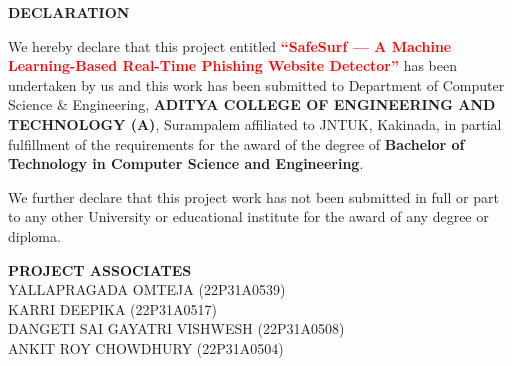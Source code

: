 \begin{center}
{\bfseries\fontsize{16}{18}\selectfont DECLARATION}
\end{center}

\vspace{0.5cm}
\noindent
We hereby declare that this project entitled
\textbf{\textcolor{red}{``SafeSurf — A Machine Learning-Based Real-Time Phishing Website Detector''}}
has been undertaken by us and this work has been submitted to Department of Computer Science \& Engineering,
\textbf{ADITYA \newline COLLEGE OF ENGINEERING AND TECHNOLOGY (A)}, Surampalem affiliated to JNTUK, Kakinada,
in partial fulfillment of the requirements for the award of the degree of
\textbf{Bachelor of Technology in Computer Science and Engineering}.

\vspace{0.5cm}

\noindent
We further declare that this project work has not been submitted in full or part to any other University
or educational institute for the award of any degree or diploma.

\vspace{2cm}

\begin{flushright}
\textbf{PROJECT ASSOCIATES}\\[0.5cm]

YALLAPRAGADA OMTEJA (22P31A0539)\\
KARRI DEEPIKA (22P31A0517)\\
DANGETI SAI GAYATRI VISHWESH (22P31A0508)\\
ANKIT ROY CHOWDHURY (22P31A0504)
\end{flushright}